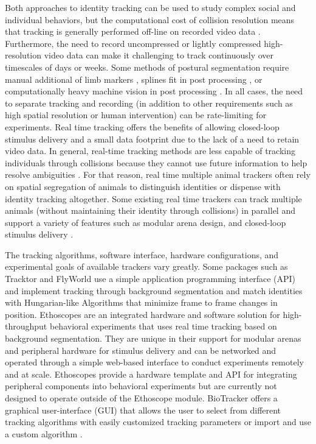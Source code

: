 \documentclass[10pt]{article}
\begin{document}
\begin{multicols}{2}
Both approaches to identity tracking can be used to study complex social and individual behaviors, but the computational cost of collision resolution means that tracking is generally performed off-line on recorded video data \cite{Liu_A_2018}. Furthermore, the need to record uncompressed or lightly compressed high-resolution video data can make it challenging to track continuously over timescales of days or weeks. Some methods of postural segmentation require manual additional of limb markers \cite{Kain_Leg_2013}, splines fit in post processing \cite{Uhlmann_FlyLimbTracker_2017}, or computationally heavy machine vision in post processing \cite{Mathis_DeepLabCut_2018,Pereira_Fast_2018}. In all cases, the need to separate tracking and recording (in addition to other requirements such as high spatial resolution or human intervention) can be rate-limiting for experiments. Real time tracking offers the benefits of allowing closed-loop stimulus delivery and a small data footprint due to the lack of a need to retain video data. In general, real-time tracking methods are less capable of tracking individuals through collisions because they cannot use future information to help resolve ambiguities \cite{Itskovits_A_2017}. For that reason, real time multiple animal trackers often rely on spatial segregation of animals to distinguish identities or dispense with identity tracking altogether\cite{Liu_A_2018}. Some existing real time trackers can track multiple animals (without maintaining their identity through collisions) in parallel and support a variety of features such as modular arena design, and closed-loop stimulus delivery \cite{Geissmann_Ethoscopes_2017,Straw_Multi_2011,Stowers_Virtual_2017,Chagas_The_2017}.

The tracking algorithms, software interface, hardware configurations, and experimental goals of available trackers vary greatly. Some packages such as Tracktor and FlyWorld use a simple application programming interface (API) and implement tracking through background segmentation and match identities with Hungarian-like Algorithms that minimize frame to frame changes in position. Ethoscopes are an integrated hardware and software solution for high-throughput behavioral experiments that uses real time tracking based on background segmentation. They are unique in their support for modular arenas and peripheral hardware for stimulus delivery \cite{Geissmann_Ethoscopes_2017} and can be networked and operated through a simple web-based interface to conduct experiments remotely and at scale. Ethoscopes provide a hardware template and API for integrating peripheral components into behavioral experiments but are currently not designed to operate outside of the Ethoscope module.  BioTracker offers a graphical user-interface (GUI) that allows the user to select from different tracking algorithms with easily customized tracking parameters or import and use a custom algorithm \cite{Mnck_BioTracker_2018}. 


\end{multicols}
\end{document}
